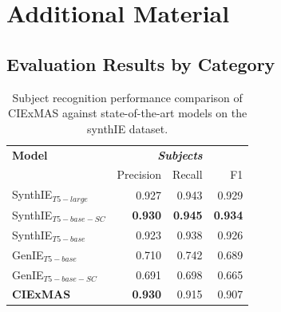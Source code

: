 \documentclass[a4paper,oneside,bibliography=totoc]{scrbook}
\begin{document}
\appendix
\chapter{Additional Material}
\label{ch:additional_material}

\section{Evaluation Results by Category}

\begin{table}[h]
  \centering
  \begin{tabular}{l|rrr}
    \toprule
    \textbf{Model}         & \multicolumn{3}{c}{\textit{\textbf{Subjects}}}                                   \\
                           & Precision                                      & Recall         & F1             \\
    \midrule
    SynthIE$_{T5-large}$   & 0.927                                          & 0.943          & 0.929          \\
    SynthIE$_{T5-base-SC}$ & \textbf{0.930}                                 & \textbf{0.945} & \textbf{0.934} \\
    SynthIE$_{T5-base}$    & 0.923                                          & 0.938          & 0.926          \\
    GenIE$_{T5-base}$      & 0.710                                          & 0.742          & 0.689          \\
    GenIE$_{T5-base-SC}$   & 0.691                                          & 0.698          & 0.665          \\
    \midrule
    \textbf{CIExMAS}       & \textbf{0.930}                                 & 0.915          & 0.907          \\
    \bottomrule
  \end{tabular}
  \caption{Subject recognition performance comparison of CIExMAS against state-of-the-art models on the synthIE dataset.}
  \label{tab:evaluation_subjects}
\end{table}
\end{document}
